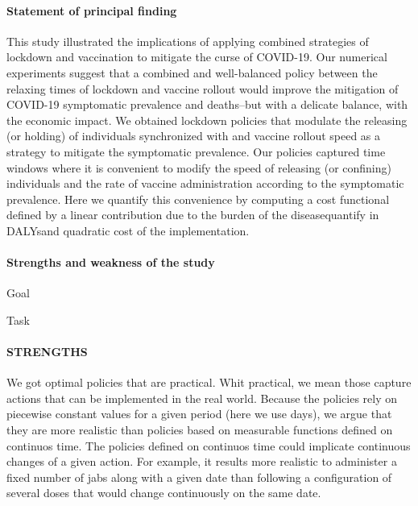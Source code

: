 
\paragraph{Statement of principal finding}
    This study illustrated the implications of applying 
combined strategies of lockdown and vaccination to mitigate the curse 
of COVID-19. Our numerical experiments suggest that a combined and 
well-balanced policy between the relaxing times of lockdown and 
vaccine rollout would improve the mitigation of COVID-19 symptomatic 
prevalence and deaths--but with a delicate balance, 
with the economic impact. We obtained lockdown policies that modulate the 
releasing (or holding) of individuals synchronized with and vaccine rollout 
speed as a strategy to mitigate the symptomatic prevalence. 
Our policies captured time windows where it is convenient to modify the 
speed of releasing (or confining) individuals and the rate of vaccine 
administration according to the symptomatic prevalence. 
Here we quantify this convenience by computing a cost functional defined 
by a linear contribution due to the burden of the 
disease\textemdash quantify in DALYs\textemdash and quadratic cost 
of the implementation.

\paragraph{Strengths and weakness of the study}
    \begin{CheckList}{Goal}
            \begin{CheckList}{Task}
            \end{CheckList}
    \end{CheckList}

    \paragraph[]{STRENGTHS}
	        We got optimal policies that are practical. 
        Whit practical, we mean those capture actions that can be
	    implemented in the real world. Because the policies rely on 
	    piecewise constant values for a given period (here we use 
	    days), we argue that they are more realistic than policies 
	    based on measurable functions defined on continuos time.
        The policies defined on continuos time could implicate
	    continuous changes of a given action. %
        For example, it results more realistic to administer a 
        fixed number of jabs along with a given date than following 
        a configuration of several doses that would change continuously 
        on the same date.
    

